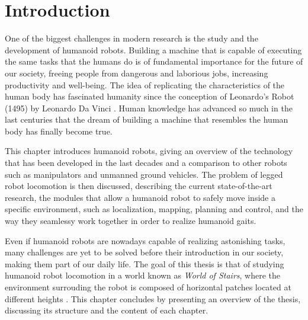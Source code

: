 \chapter{Introduction}
One of the biggest challenges in modern research is the study and the 
development of humanoid robots. Building a machine that is capable of executing 
the same tasks that the humans do is of fundamental importance for the future 
of our society, freeing people from dangerous and laborious jobs, increasing 
productivity and well-being. The idea of replicating the characteristics of 
the human body has fascinated humanity since the conception of Leonardo's
Robot (1495) by Leonardo Da Vinci \cite{Moran2007TheDaVinciRobot}. Human 
knowledge has advanced so much in the last centuries that the dream of 
building a machine that resembles the human body has finally become true.

This chapter introduces humanoid robots, giving an overview of the technology 
that has been developed in the last decades and a comparison to other robots
such as manipulators and unmanned ground vehicles. The problem of legged 
robot locomotion is then discussed, describing the current state-of-the-art 
research, the modules that allow a 
humanoid robot to safely move inside a specific environment, such as 
localization, mapping, planning and control, and the way they seamlessy work
together in order to realize humanoid gaits.

Even if humanoid robots are nowadays capable of realizing astonishing tasks,
many challenges are yet to be solved before their introduction in our 
society, making them part of our daily life. The goal of this thesis is that 
of studying humanoid robot locomotion in a world known as \textit{World of 
Stairs}, where the environment surrouding the robot is composed of 
horizontal patches located at different heights \cite{ECC19}. This chapter 
concludes by presenting an overview of the thesis, discussing its 
structure and the content of each chapter. 

